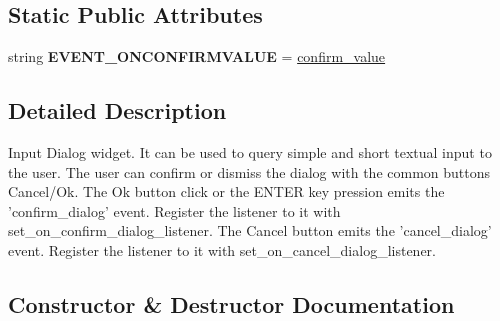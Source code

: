 \subsection*{Static Public Attributes}
\begin{DoxyCompactItemize}
\item 
string {\bfseries E\+V\+E\+N\+T\+\_\+\+O\+N\+C\+O\+N\+F\+I\+R\+M\+V\+A\+L\+UE} = \textquotesingle{}\hyperlink{classremi_1_1gui_1_1InputDialog_a65b20b4e39fdd759fbd47ea081a9b3cd}{confirm\+\_\+value}\textquotesingle{}\hypertarget{classremi_1_1gui_1_1InputDialog_a02248849678e75014ee54e297c0b5585}{}\label{classremi_1_1gui_1_1InputDialog_a02248849678e75014ee54e297c0b5585}

\end{DoxyCompactItemize}


\subsection{Detailed Description}
\begin{DoxyVerb}Input Dialog widget. It can be used to query simple and short textual input to the user.
The user can confirm or dismiss the dialog with the common buttons Cancel/Ok.
The Ok button click or the ENTER key pression emits the 'confirm_dialog' event. Register the listener to it
with set_on_confirm_dialog_listener.
The Cancel button emits the 'cancel_dialog' event. Register the listener to it with set_on_cancel_dialog_listener.
\end{DoxyVerb}
 

\subsection{Constructor \& Destructor Documentation}
